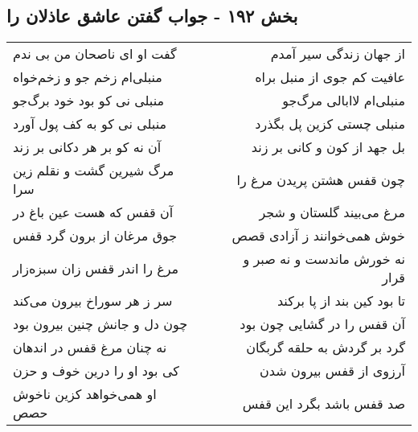 \begin{center}
\section*{بخش ۱۹۲ - جواب گفتن عاشق عاذلان را}
\label{sec:sh192}
\begin{longtable}{l p{0.5cm} r}
گفت او ای ناصحان من بی ندم
&&
از جهان زندگی سیر آمدم
\\
منبلی‌ام زخم جو و زخم‌خواه
&&
عافیت کم جوی از منبل براه
\\
منبلی نی کو بود خود برگ‌جو
&&
منبلی‌ام لاابالی مرگ‌جو
\\
منبلی نی کو به کف پول آورد
&&
منبلی چستی کزین پل بگذرد
\\
آن نه کو بر هر دکانی بر زند
&&
بل جهد از کون و کانی بر زند
\\
مرگ شیرین گشت و نقلم زین سرا
&&
چون قفس هشتن پریدن مرغ را
\\
آن قفس که هست عین باغ در
&&
مرغ می‌بیند گلستان و شجر
\\
جوق مرغان از برون گرد قفس
&&
خوش همی‌خوانند ز آزادی قصص
\\
مرغ را اندر قفس زان سبزه‌زار
&&
نه خورش ماندست و نه صبر و قرار
\\
سر ز هر سوراخ بیرون می‌کند
&&
تا بود کین بند از پا برکند
\\
چون دل و جانش چنین بیرون بود
&&
آن قفس را در گشایی چون بود
\\
نه چنان مرغ قفس در اندهان
&&
گرد بر گردش به حلقه گربگان
\\
کی بود او را درین خوف و حزن
&&
آرزوی از قفس بیرون شدن
\\
او همی‌خواهد کزین ناخوش حصص
&&
صد قفس باشد بگرد این قفس
\\
\end{longtable}
\end{center}
